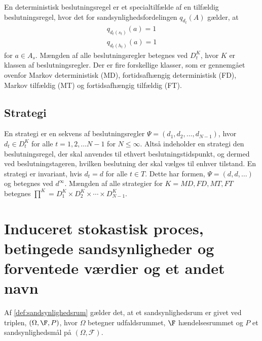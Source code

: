 En deterministisk beslutningsregel er et specialtilfælde af en tilfældig beslutningsregel, hvor det for sandsynlighedsfordelingen $q_{d_t}(A)$ gælder, at
\begin{align*}
    q_{d_t(s_t)}(a)=1\\
    q_{d_t(h_t)}(a)=1
\end{align*}
for $a\in A_s$. Mængden af alle beslutningsregler betegnes ved $D_t^K$, hvor $K$ er klassen af beslutningsregler. Der er fire forskellige klasser, som er gennemgået ovenfor Markov deterministisk (MD), fortidsafhængig deterministisk (FD), Markov tilfældig (MT) og fortidsafhængig tilfældig (FT). 

\subsection{Strategi}
En strategi er en sekvens af beslutningsregler $\Psi=(d_1,d_2,\dots,d_{N-1})$, hvor $d_t\in D_t^K$ for alle $t=1, 2, \dots N-1$ for $N \leq \infty$. Altså indeholder en strategi den beslutningsregel, der skal anvendes til ethvert beslutningstidspunkt, og dermed ved beslutningstageren, hvilken beslutning der skal vælges til enhver tilstand. En strategi er invariant, hvis $d_t=d$ for alle $t\in T$. Dette har formen, $\Psi=(d,d,\dots)$ og betegnes ved $d^\infty$. 
Mængden af alle strategier for $K=MD, FD, MT, FT$ betegnes $\prod^K=D_1^K\times D_2^K\times \cdots\times D_{N-1}^K$.



\section{Induceret stokastisk proces, betingede sandsynligheder og forventede værdier og et andet navn}

Af \autoref{def:sandsynlighedsrum} gælder det, at et sandsynlighedsrum er givet ved triplen, $(\Omega, \F, P)$, hvor $\Omega$ betegner udfaldsrummet, $\F$ hændelsesrummet og $P$ et sandsynlighedsmål på $(\Omega,\mathcal{F})$.

